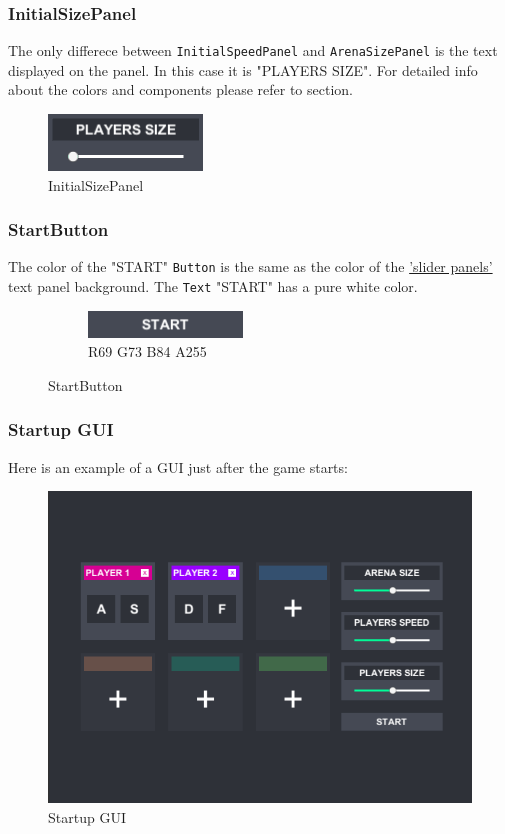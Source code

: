 \subsubsection*{InitialSizePanel}\label{gui-initialsizepanel}
\indent The only differece between \verb+InitialSpeedPanel+ and \verb+ArenaSizePanel+ is the text displayed on the panel. In this case it is "PLAYERS SIZE". For detailed info about the colors and components please refer to  section.
\begin{figure}[!h] 
\centering
\includegraphics[scale=1]{initialsizepanel}
\caption{InitialSizePanel}
\end{figure}

\subsubsection*{StartButton}\label{gui-startbutton}
\indent The color of the "START" \verb+Button+ is the same as the color of the \hyperref[gui-arenasizepanel]{'slider panels'} text panel background. The \verb+Text+ "START" has a pure white color.
\begin{figure}[h]
\centering
\begin{subfigure}{\textwidth}
\centering
\includegraphics[]{startbutton}
\caption*{R69 G73 B84 A255}
\end{subfigure}
\caption{StartButton}
\end{figure}

\subsubsection*{Startup GUI}
\indent Here is an example of a GUI just after the game starts:
\begin{figure}[h] 
\centering
\includegraphics[width=\textwidth]{startupgui}
\caption{Startup GUI}
\end{figure}


